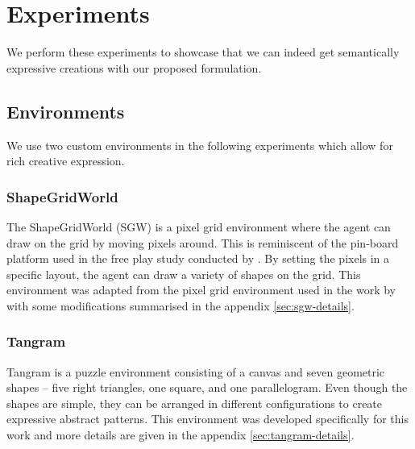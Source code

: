 \chapter{Experiments}
\label{sec:experiments}

We perform these experiments to showcase that we can indeed get semantically expressive creations with our proposed formulation.


\section{Environments}

We use two custom environments in the following experiments which allow for rich creative expression.

\subsection{ShapeGridWorld}
\label{sec:sgw}
The ShapeGridWorld (SGW) is a pixel grid environment where the agent can draw on the grid by moving pixels around.
This is reminiscent of the pin-board platform used in the free play study conducted by \citet{diggs}.
By setting the pixels in a specific layout, the agent can draw a variety of shapes on the grid.
This environment was adapted from the pixel grid environment used in the work by \citet{rair} with some modifications summarised in the appendix \ref{sec:sgw-details}.

\subsection{Tangram}
\label{sec:tangram}
Tangram is a puzzle environment consisting of a canvas and seven geometric shapes -- five right triangles, one square, and one parallelogram.
Even though the shapes are simple, they can be arranged in different configurations to create expressive abstract patterns.
This environment was developed specifically for this work and more details are given in the appendix \ref{sec:tangram-details}.

